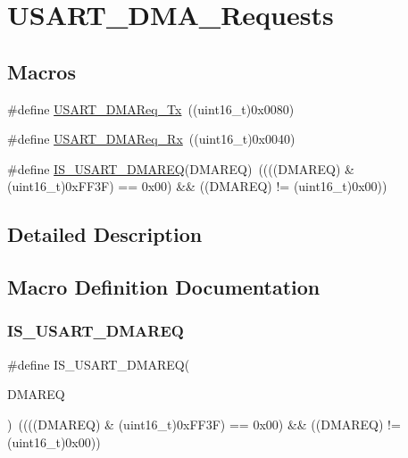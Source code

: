 \hypertarget{group___u_s_a_r_t___d_m_a___requests}{}\section{U\+S\+A\+R\+T\+\_\+\+D\+M\+A\+\_\+\+Requests}
\label{group___u_s_a_r_t___d_m_a___requests}
\subsection*{Macros}
\begin{DoxyCompactItemize}
\item 
\#define \mbox{\hyperlink{group___u_s_a_r_t___d_m_a___requests_gae38097d8f82ba969c9812194022cae9a}{U\+S\+A\+R\+T\+\_\+\+D\+M\+A\+Req\+\_\+\+Tx}}~((uint16\+\_\+t)0x0080)
\item 
\#define \mbox{\hyperlink{group___u_s_a_r_t___d_m_a___requests_gaf33c13abb942251afab3297d8b8362ca}{U\+S\+A\+R\+T\+\_\+\+D\+M\+A\+Req\+\_\+\+Rx}}~((uint16\+\_\+t)0x0040)
\item 
\#define \mbox{\hyperlink{group___u_s_a_r_t___d_m_a___requests_ga8be7a899d21d82de2ee0a763b4564dc3}{I\+S\+\_\+\+U\+S\+A\+R\+T\+\_\+\+D\+M\+A\+R\+EQ}}(D\+M\+A\+R\+EQ)~((((D\+M\+A\+R\+EQ) \& (uint16\+\_\+t)0x\+F\+F3\+F) == 0x00) \&\& ((\+D\+M\+A\+R\+E\+Q) != (uint16\+\_\+t)0x00))
\end{DoxyCompactItemize}


\subsection{Detailed Description}


\subsection{Macro Definition Documentation}
\mbox{\label{group___u_s_a_r_t___d_m_a___requests_ga8be7a899d21d82de2ee0a763b4564dc3}} 
\subsubsection{\texorpdfstring{IS\_USART\_DMAREQ}{IS\_USART\_DMAREQ}}
{\footnotesize\ttfamily \#define I\+S\+\_\+\+U\+S\+A\+R\+T\+\_\+\+D\+M\+A\+R\+EQ(\begin{DoxyParamCaption}\item[{}]{D\+M\+A\+R\+EQ }\end{DoxyParamCaption})~((((D\+M\+A\+R\+EQ) \& (uint16\+\_\+t)0x\+F\+F3\+F) == 0x00) \&\& ((\+D\+M\+A\+R\+E\+Q) != (uint16\+\_\+t)0x00))}

